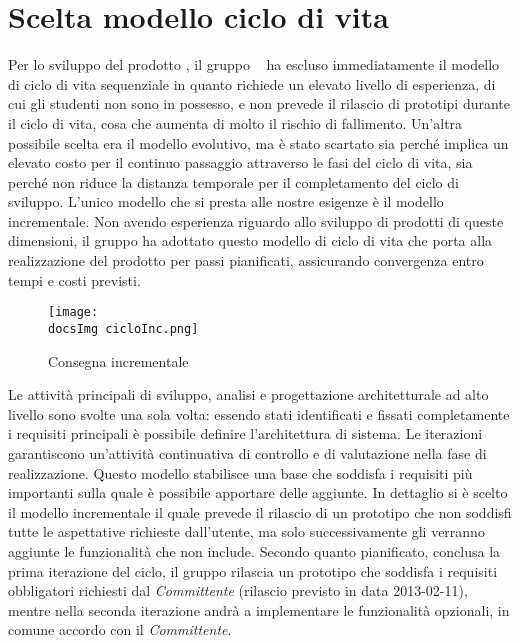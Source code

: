 \section{Scelta modello ciclo di vita}{
Per lo sviluppo del prodotto \textbf{\mytalk}, il gruppo \textit{\ggt~} ha escluso immediatamente il modello di ciclo di vita sequenziale in quanto richiede un elevato livello di esperienza, di cui gli studenti non sono in possesso, e non prevede il rilascio di prototipi durante il ciclo di vita,  cosa che aumenta di molto il rischio di fallimento.
Un’altra possibile scelta era il modello evolutivo, ma è stato scartato sia perché implica un elevato costo per il continuo passaggio attraverso le fasi del ciclo di vita, sia perché non riduce la distanza temporale per il completamento del ciclo di sviluppo.
L’unico modello che si presta alle nostre esigenze è il modello incrementale.
Non avendo esperienza riguardo allo sviluppo di prodotti di queste dimensioni, il gruppo ha adottato questo modello di ciclo di vita che porta alla realizzazione del prodotto per passi pianificati, assicurando convergenza entro tempi e costi previsti.

\begin{center}
\begin{figure}[h]
\centering
\texttt{[image: \\docsImg cicloInc.png]}
\label{fig: cicloIncrementale}
\caption{Consegna incrementale}
\end{figure}
\end{center}

Le attività principali di sviluppo, analisi e progettazione architetturale ad alto livello sono svolte una sola volta: essendo stati identificati e fissati completamente i requisiti principali è possibile definire l’architettura di sistema. 
Le iterazioni garantiscono un'attività continuativa di controllo e di valutazione nella fase di realizzazione.
Questo modello stabilisce una base che soddisfa i requisiti più importanti sulla quale è possibile apportare delle aggiunte.
In dettaglio si è scelto il modello incrementale il quale prevede il rilascio di un prototipo che non soddisfi tutte le aspettative richieste dall'utente, ma solo successivamente gli verranno aggiunte le funzionalità che non include. 
Secondo quanto pianificato, conclusa la prima iterazione del ciclo, il gruppo rilascia un prototipo che soddisfa i requisiti obbligatori richiesti dal \textit{Committente}  (rilascio previsto in data 2013-02-11), mentre nella seconda iterazione andrà a implementare le funzionalità opzionali, in comune accordo con il \textit{Committente}.
}

